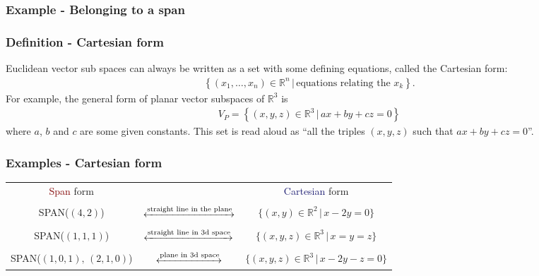 \documentclass[usenames,dvipsnames,aspectratio=169,10pt]{beamer}
\numberwithin{equation}{section}
\begin{document}
\begin{frame}
\frametitle{Example - Belonging to a span}
\end{frame}
\fi


\begin{frame}
\frametitle{Definition - Cartesian form}
Euclidean vector sub spaces can always be written as a set with some defining equations, called the Cartesian form:
\begin{align*}
\left\{ (x_1,\dots,x_n) \in \mathbb{R}^n \, | \, \text{equations relating the } x_k \right\}.
\end{align*}
For example, the general form of planar vector subspaces of $\mathbb{R}^3$ is
\begin{align*}
V_P = \left\{ (x,y,z)\in \mathbb{R}^3 \, | \, ax + by + cz = 0\right\}
\end{align*}
where $a$, $b$ and $c$ are some given constants. This set is read aloud as ``all the triples $(x,y,z)$ such that $ax + by + cz = 0$''.
\end{frame}



\begin{frame}
\frametitle{Examples - Cartesian form}

\begin{table}
\begin{tabular}{ccc}
{\Large \textcolor{Maroon}{Span} form} & &  {\Large \textcolor{MidnightBlue}{Cartesian} form} \\ \\
SPAN($(4,2)$) & $\xleftrightarrow{\text{straight line in the plane}}$ & $\{(x,y)\in\mathbb{R}^2 \, | \, x - 2y = 0 \}$ \\ \\
SPAN($(1,1,1)$) & $\xleftrightarrow{\text{straight line in 3d space}}$ & $\{(x,y,z)\in\mathbb{R}^3 \, | \, x = y = z \}$ \\ \\
SPAN($(1,0,1),\, (2,1,0)$) & $\xleftrightarrow{\text{plane in 3d space}}$ & $\{(x,y,z)\in\mathbb{R}^3 \, | \, x - 2y - z = 0 \}$
\end{tabular}
\end{table}

\end{frame}
\end{document}
